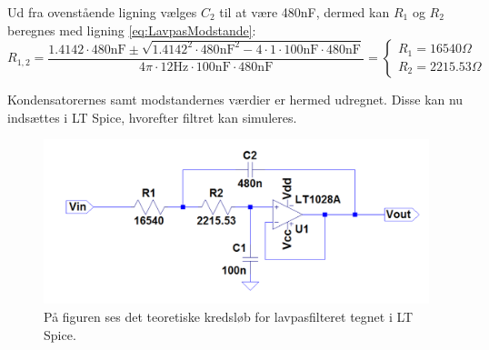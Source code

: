 \noindent Ud fra ovenstående ligning vælges $C_2$ til at være 480nF, dermed kan $R_1$ og $R_2$ beregnes med ligning \ref{eq:LavpasModstande}:
\begin{equation}
R_{1,2} = \frac{1.4142 \cdot 480\text{nF} \pm \sqrt{1.4142^2 \cdot 480\text{nF}^2 - 4 \cdot 1 \cdot 100\text{nF} \cdot 480\text{nF}}}{4 \pi \cdot 12\text{Hz} \cdot 100\text{nF} \cdot 480\text{nF}} = \begin{cases} R_{1} = 16540 \Omega \\ R_{2} = 2215.53 \Omega \end{cases}
\end{equation}

\noindent Kondensatorernes samt modstandernes værdier er hermed udregnet. Disse kan nu indsættes i LT Spice, hvorefter filtret kan simuleres. 

\begin{figure}[H]
	\centering
	\includegraphics[scale=0.58]{figures/cProblemloesning/Lavpasfilter_teoretisk.PNG}
	\caption{På figuren ses det teoretiske kredsløb for lavpasfilteret tegnet i LT Spice.}
	\label{fig:lavpasfilter_teoretisk}
\end{figure}